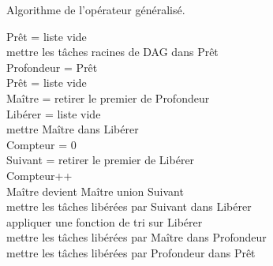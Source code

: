 \begin{algorithm}
  \caption{Algorithme de l'opérateur généralisé.}
  \label{algo:algo_G}
  {\sc Prêt} = liste vide \\
  mettre les tâches racines de DAG dans {\sc Prêt} \\
   {
    {\sc Profondeur} = {\sc Prêt} \\
    {\sc Prêt} = liste vide \\
     {
      {\sc Maître} = retirer le premier de {\sc Profondeur} \\
      {\sc Libérer} = liste vide \\
      mettre {\sc Maître} dans {\sc Libérer} \\
      {\sc Compteur} = 0 \\
       {
        {\sc Suivant} = retirer le premier de {\sc Libérer} \\
        {\sc Compteur}++\\
        {\sc Maître} devient {\sc Maître} union {\sc Suivant}\\
        mettre les tâches libérées par {\sc Suivant} dans {\sc Libérer} \\
        appliquer une fonction de tri sur {\sc Libérer} \\
      }
      mettre les tâches libérées par {\sc Maître} dans {\sc Profondeur} \\
    }
    mettre les tâches libérées par {\sc Profondeur} dans {\sc Prêt}\\
  }
\end{algorithm}
